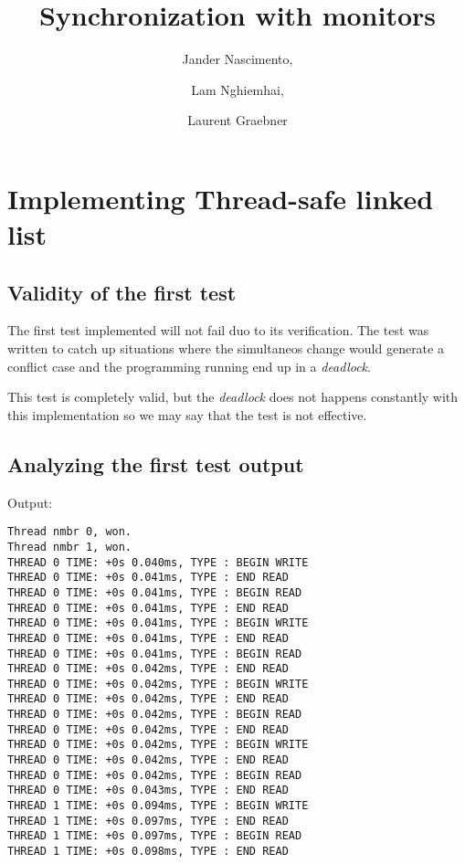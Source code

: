 \documentclass{article}
\begin{document}
\title{Synchronization with monitors}

\author{Jander Nascimento,
\and Lam Nghiemhai, 
\and Laurent Graebner}

\maketitle

\tableofcontents

\section{Implementing Thread-safe linked list}          

	\subsection{Validity of the first test}
		
		The first test implemented will not fail duo to its verification. The test was written
		to catch up situations where the simultaneos change would generate a conflict case and
		the programming running end up in a \textit{deadlock}.
		
		This test is completely valid, but the \textit{deadlock} does not happens constantly with 
		this implementation so we may say that the test is not effective.

	\subsection{Analyzing the first test output}

		Output:

		\begin{lstlisting}
Thread nmbr 0, won.
Thread nmbr 1, won.
THREAD 0 TIME: +0s 0.040ms, TYPE : BEGIN WRITE
THREAD 0 TIME: +0s 0.041ms, TYPE : END READ
THREAD 0 TIME: +0s 0.041ms, TYPE : BEGIN READ
THREAD 0 TIME: +0s 0.041ms, TYPE : END READ
THREAD 0 TIME: +0s 0.041ms, TYPE : BEGIN WRITE
THREAD 0 TIME: +0s 0.041ms, TYPE : END READ
THREAD 0 TIME: +0s 0.041ms, TYPE : BEGIN READ
THREAD 0 TIME: +0s 0.042ms, TYPE : END READ
THREAD 0 TIME: +0s 0.042ms, TYPE : BEGIN WRITE
THREAD 0 TIME: +0s 0.042ms, TYPE : END READ
THREAD 0 TIME: +0s 0.042ms, TYPE : BEGIN READ
THREAD 0 TIME: +0s 0.042ms, TYPE : END READ
THREAD 0 TIME: +0s 0.042ms, TYPE : BEGIN WRITE
THREAD 0 TIME: +0s 0.042ms, TYPE : END READ
THREAD 0 TIME: +0s 0.042ms, TYPE : BEGIN READ
THREAD 0 TIME: +0s 0.043ms, TYPE : END READ
THREAD 1 TIME: +0s 0.094ms, TYPE : BEGIN WRITE
THREAD 1 TIME: +0s 0.097ms, TYPE : END READ
THREAD 1 TIME: +0s 0.097ms, TYPE : BEGIN READ
THREAD 1 TIME: +0s 0.098ms, TYPE : END READ   
		\end{lstlisting}
\end{document}

